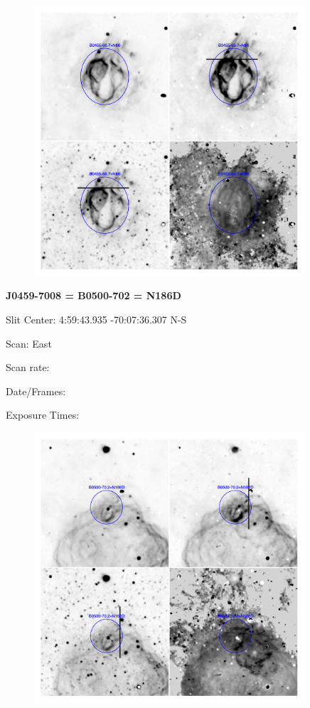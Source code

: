 \documentclass[11pt]{article}
\begin{document}
\begin{figure}
\includegraphics[width=10.05cm]{snapshots/B0455-687.png}
\end{figure}


\newpage
{\bf J0459-7008 = B0500-702 = N186D}

Slit Center:   4:59:43.935    -70:07:36.307     N-S

Scan:  East

Scan rate:  

Date/Frames:

Exposure Times:  

\begin{figure}
\includegraphics[width=10.05cm]{snapshots/B0500-702.png}
\end{figure}
\end{document}
